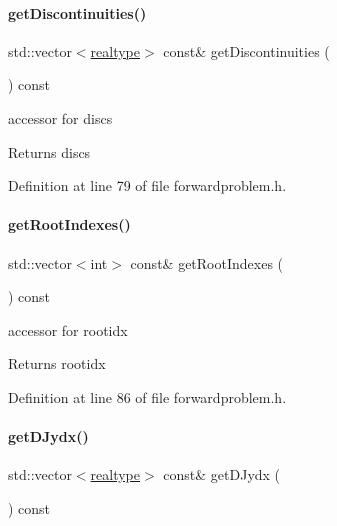 \paragraph{\texorpdfstring{get\+Discontinuities()}{getDiscontinuities()}}
{\footnotesize\ttfamily std\+::vector$<$\mbox{\hyperlink{namespaceamici_a1bdce28051d6a53868f7ccbf5f2c14a3}{realtype}}$>$ const\& get\+Discontinuities (\begin{DoxyParamCaption}{ }\end{DoxyParamCaption}) const}

accessor for discs \begin{DoxyReturn}{Returns}
discs 
\end{DoxyReturn}


Definition at line 79 of file forwardproblem.\+h.

\mbox{\label{classamici_1_1_forward_problem_a81f0a7c547a343c3bcd179ba5439beb3}} 
\paragraph{\texorpdfstring{get\+Root\+Indexes()}{getRootIndexes()}}
{\footnotesize\ttfamily std\+::vector$<$int$>$ const\& get\+Root\+Indexes (\begin{DoxyParamCaption}{ }\end{DoxyParamCaption}) const}

accessor for rootidx \begin{DoxyReturn}{Returns}
rootidx 
\end{DoxyReturn}


Definition at line 86 of file forwardproblem.\+h.

\mbox{\label{classamici_1_1_forward_problem_afb4ec4e3a67624dddea0cd64fca29ae9}} 
\paragraph{\texorpdfstring{get\+D\+Jydx()}{getDJydx()}}
{\footnotesize\ttfamily std\+::vector$<$\mbox{\hyperlink{namespaceamici_a1bdce28051d6a53868f7ccbf5f2c14a3}{realtype}}$>$ const\& get\+D\+Jydx (\begin{DoxyParamCaption}{ }\end{DoxyParamCaption}) const}

